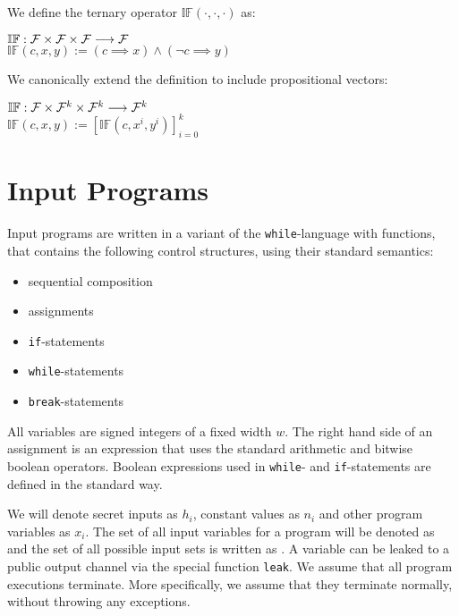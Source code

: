 \begin{definition}
    We define the ternary operator $\mathbb{IF}(\cdot, \cdot, \cdot)$ as:
    \begin{center}
        $\mathbb{IF}: \mathcal{F} \times \mathcal{F} \times \mathcal{F} \longrightarrow \mathcal{F}$\\
        $\mathbb{IF}(c, x, y) := (c \implies x) \land (\lnot c \implies y)$
    \end{center}
    We canonically extend the definition to include propositional vectors:
    \begin{center}
        $\mathbb{IF}: \mathcal{F} \times \mathcal{F}^k \times \mathcal{F}^k \longrightarrow \mathcal{F}^k$\\
        $\mathbb{IF}(c, x, y) := [\mathbb{IF}(c, x^i, y^i)]_{i = 0}^k$
    \end{center}
\end{definition}

\section{Input Programs}\label{sec:inputLang}

Input programs are written in a variant of the \texttt{while}-language with functions, that contains the following control structures, using their standard semantics:
\begin{itemize}
    \setlength\itemsep{0em}
    \item sequential composition
    \item assignments
    \item \texttt{if}-statements
    \item \texttt{while}-statements
    \item \texttt{break}-statements
\end{itemize}
All variables are signed integers of a fixed width $w$. The right hand side of an assignment is an expression that uses the standard arithmetic and bitwise boolean operators. Boolean expressions used in \texttt{while}- and \texttt{if}-statements are defined in the standard way.

We will denote secret inputs as $h_i$, constant values as $n_i$ and other program variables as $x_i$. The set of all input variables for a program will be denoted as \In and the set of all possible input sets is written as \allIn. A variable can be leaked to a public output channel via the special function \texttt{leak}. We assume that all program executions terminate. More specifically, we assume that they terminate normally, without throwing any exceptions.

